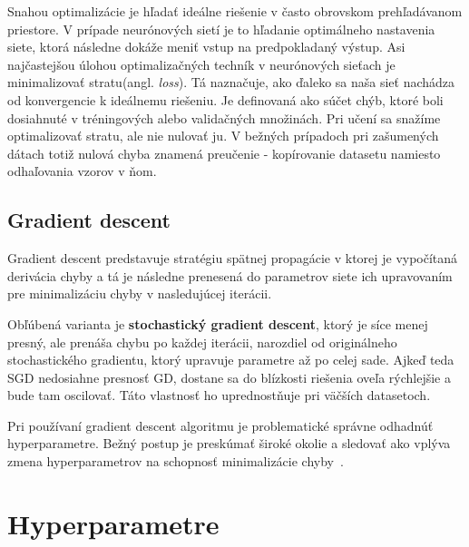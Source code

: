 Snahou optimalizácie je hľadať ideálne riešenie v často obrovskom prehľadávanom priestore. V prípade neurónových sietí je to hľadanie optimálneho nastavenia siete, ktorá následne dokáže meniť vstup na predpokladaný výstup. Asi najčastejšou úlohou optimalizačných techník v neurónových sieťach je minimalizovať stratu(angl. \textit{loss}). Tá naznačuje, ako ďaleko sa naša sieť nachádza od konvergencie k ideálnemu riešeniu. Je definovaná ako súčet chýb, ktoré boli dosiahnuté v tréningových alebo validačných množinách. Pri učení sa snažíme optimalizovať stratu, ale nie nulovať ju. V bežných prípadoch pri zašumených dátach totiž nulová chyba znamená preučenie - kopírovanie datasetu namiesto odhaľovania vzorov v ňom.

\subsection{Gradient descent}
\label{stochastic_gradient_descent}

Gradient descent predstavuje stratégiu spätnej propagácie v ktorej je vypočítaná derivácia chyby a tá je následne prenesená do parametrov siete ich upravovaním pre minimalizáciu chyby v nasledujúcej iterácii. 

Obľúbená varianta je \textbf{stochastický gradient descent}, ktorý je síce menej presný, ale prenáša chybu po každej iterácii, narozdiel od originálneho stochastického gradientu, ktorý upravuje parametre až po celej sade. Ajkeď teda SGD nedosiahne presnosť GD, dostane sa do blízkosti riešenia oveľa rýchlejšie a bude tam oscilovať. Táto vlastnosť ho uprednostňuje pri väčších datasetoch.

Pri používaní gradient descent algoritmu je problematické správne odhadnúť hyperparametre. Bežný postup je preskúmať široké okolie a sledovať ako vplýva zmena hyperparametrov na schopnosť minimalizácie chyby~\cite{zhang2004solving}.


\section{Hyperparametre}
\label{analyza_hyperparametre}

